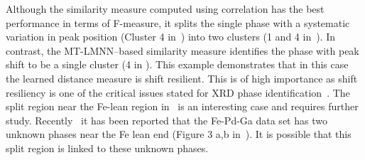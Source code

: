 Although the similarity measure computed using correlation has the best performance in terms of F-measure, it splits the single phase with a systematic variation in peak position (Cluster 4 in~) into two clusters (1 and 4 in~).
In contrast, the MT-LMNN--based similarity measure identifies the phase with peak shift to be a single cluster (4 in ). 
This example demonstrates that in this case the learned distance measure is shift resilient.  This is of high importance as shift resiliency is one of the critical issues stated for XRD phase identification~\cite{iwasaki2017comparison,hattrick2016perspective}. The split region near the Fe-lean region in~ is an interesting case and requires further study. Recently~\cite{bunn2016semi} it has been reported that the Fe-Pd-Ga data set has two unknown phases near the Fe lean end (Figure 3 a,b in~\cite{bunn2016semi}). It is possible that this split region is linked to these unknown phases.

